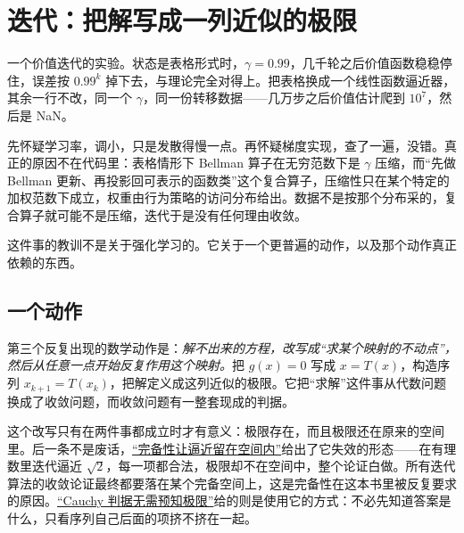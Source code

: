 \section{迭代：把解写成一列近似的极限}
\label{sec:17-Synthesis/02-Recurring-Ideas/03}

一个价值迭代的实验。状态是表格形式时，\(\gamma=0.99\)，几千轮之后价值函数稳稳停住，误差按 \(0.99^{k}\) 掉下去，与理论完全对得上。把表格换成一个线性函数逼近器，其余一行不改，同一个 \(\gamma\)，同一份转移数据——几万步之后价值估计爬到 \(10^{7}\)，然后是 NaN。

先怀疑学习率，调小，只是发散得慢一点。再怀疑梯度实现，查了一遍，没错。真正的原因不在代码里：表格情形下 Bellman 算子在无穷范数下是 \(\gamma\) 压缩，而``先做 Bellman 更新、再投影回可表示的函数类''这个复合算子，压缩性只在某个特定的加权范数下成立，权重由行为策略的访问分布给出。数据不是按那个分布采的，复合算子就可能不是压缩，迭代于是没有任何理由收敛。

这件事的教训不是关于强化学习的。它关于一个更普遍的动作，以及那个动作真正依赖的东西。

\subsection{一个动作}

第三个反复出现的数学动作是：\emph{解不出来的方程，改写成``求某个映射的不动点''，然后从任意一点开始反复作用这个映射。}把 \(g(x)=0\) 写成 \(x = T(x)\)，构造序列 \(x_{k+1}=T(x_k)\)，把解定义成这列近似的极限。它把``求解''这件事从代数问题换成了收敛问题，而收敛问题有一整套现成的判据。

这个改写只有在两件事都成立时才有意义：极限存在，而且极限还在原来的空间里。后一条不是废话，\hyperref[sec:12-Real-Analysis-Support/03-Topology-Basics/03]{``完备性让逼近留在空间内''}给出了它失效的形态——在有理数里迭代逼近 \(\sqrt2\)，每一项都合法，极限却不在空间中，整个论证白做。所有迭代算法的收敛论证最终都要落在某个完备空间上，这是完备性在这本书里被反复要求的原因。\hyperref[sec:12-Real-Analysis-Support/01-Real-Numbers-and-Completeness/02]{``Cauchy 判据无需预知极限''}给的则是使用它的方式：不必先知道答案是什么，只看序列自己后面的项挤不挤在一起。

